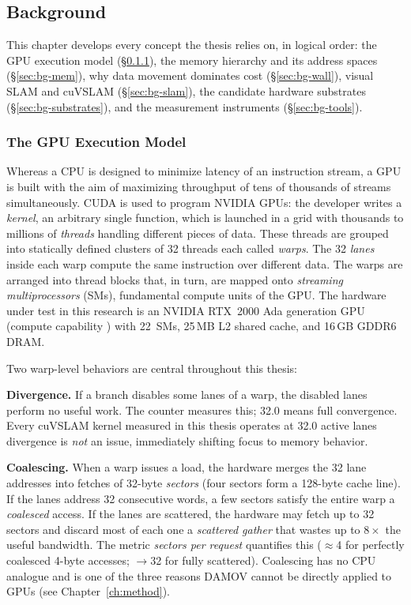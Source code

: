 \subsection{Background}\label{ch:background}

This chapter develops every concept the thesis relies on, in logical order: the GPU execution model (\S\ref{sec:bg-gpu}), the memory hierarchy and its address spaces (\S\ref{sec:bg-mem}), why data movement dominates cost (\S\ref{sec:bg-wall}), visual SLAM and cuVSLAM (\S\ref{sec:bg-slam}), the candidate hardware substrates (\S\ref{sec:bg-substrates}), and the measurement instruments (\S\ref{sec:bg-tools}).

\subsubsection{The GPU Execution Model}
\label{sec:bg-gpu}

Whereas a CPU is designed to minimize latency of an instruction stream, a GPU is built with the aim of maximizing throughput of tens of thousands of streams simultaneously. CUDA is used to program NVIDIA GPUs: the developer writes a \emph{kernel}, an arbitrary single function, which is launched in a grid with thousands to millions of \emph{threads} handling different pieces of data. These threads are grouped into statically defined clusters of 32 threads each called \emph{warps}. The 32 \emph{lanes} inside each warp compute the same instruction over different data. The warps are arranged into thread blocks that, in turn, are mapped onto \emph{streaming multiprocessors} (SMs), fundamental compute units of the GPU. The hardware under test in this research is an NVIDIA RTX~2000 Ada generation GPU (compute capability ) with 22~SMs, 25\,MB L2 shared cache, and 16\,GB GDDR6 DRAM.

Two warp-level behaviors are central throughout this thesis:

\textbf{Divergence.} If a branch disables some lanes of a warp, the disabled lanes perform no useful work. The counter  measures this; 32.0 means full convergence. Every cuVSLAM kernel measured in this thesis operates at 32.0 active lanes divergence is \emph{not} an issue, immediately shifting focus to memory behavior.

\textbf{Coalescing.} When a warp issues a load, the hardware merges the 32 lane addresses into fetches of 32-byte \emph{sectors} (four sectors form a 128-byte cache line). If the lanes address 32 consecutive words, a few sectors satisfy the entire warp a \emph{coalesced} access. If the lanes are scattered, the hardware may fetch up to 32 sectors and discard most of each one a \emph{scattered gather} that wastes up to $8\times$ the useful bandwidth. The metric \emph{sectors per request} quantifies this ($\approx$4 for perfectly coalesced 4-byte accesses; $\rightarrow$32 for fully scattered). Coalescing has no CPU analogue and is one of the three reasons DAMOV cannot be directly applied to GPUs (see Chapter~\ref{ch:method}).

